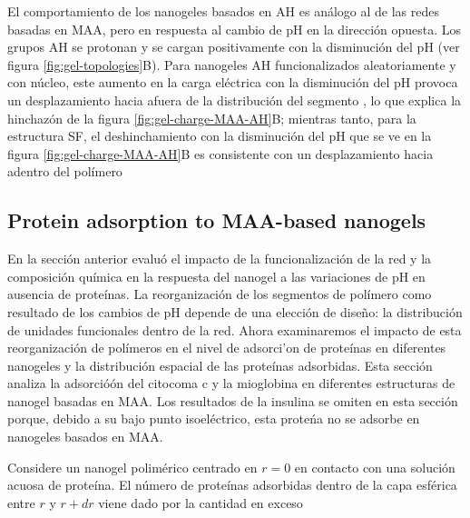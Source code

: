 El comportamiento de los nanogeles basados en AH es an\'alogo al de las redes basadas en MAA, pero en respuesta al cambio de pH en la direcci\'on opuesta.
Los grupos AH se protonan y se cargan positivamente con la disminuci\'on del pH (ver figura \ref{fig:gel-topologies}B).
Para nanogeles AH funcionalizados aleatoriamente y con n\'ucleo, este aumento en la carga el\'ectrica con la disminución del pH provoca un desplazamiento hacia afuera de la distribuci\'on del segmento %
, lo que explica la hinchaz\'on de la figura \ref{fig:gel-charge-MAA-AH}B;
mientras tanto, para la estructura SF, el deshinchamiento con la disminuci\'on del pH que se ve en la figura \ref{fig:gel-charge-MAA-AH}B es consistente con un desplazamiento hacia adentro del pol\'imero %





\subsection{Protein adsorption to MAA-based nanogels}\label{sec:MAA-NGs}




En la secci\'on anterior evalu\'o el impacto de la funcionalizaci\'on de la red y la composici\'on qu\'imica en la respuesta del nanogel a las variaciones de pH en ausencia de prote\'inas.
La reorganizaci\'on de los segmentos de pol\'imero como resultado de los cambios de pH depende de una elecci\'on de dise\~no: la distribuci\'on de unidades funcionales dentro de la red.
Ahora examinaremos el impacto de esta reorganizaci\'on de pol\'imeros en el nivel de adsorci'on de prote\'inas en diferentes nanogeles y la distribuci\'on espacial de las prote\'inas adsorbidas.
Esta secci\'on analiza la adsorció\'on del citocoma c y la mioglobina en diferentes estructuras de nanogel basadas en MAA.
Los resultados de la insulina se omiten en esta secci\'on porque, debido a su bajo punto isoel\'ectrico, esta prote\'na no se adsorbe en nanogeles basados en MAA. %

Considere un nanogel polim\'erico centrado en $r=0$ en contacto con una soluci\'on acuosa de prote\'ina.
El n\'umero de prote\'inas adsorbidas dentro de la capa esf\'erica entre $r$ y $r+dr$ viene dado por la cantidad en exceso

